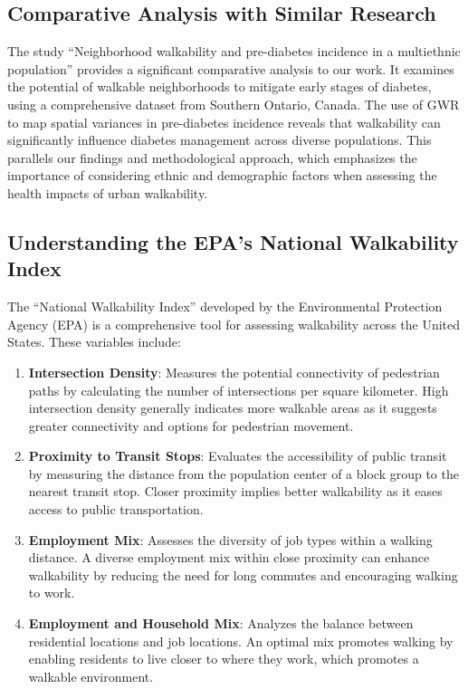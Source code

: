 \documentclass[
]{article}
\begin{document}
\subsection{Comparative Analysis with Similar
Research}\label{comparative-analysis-with-similar-research}

The study ``Neighborhood walkability and pre-diabetes incidence in a
multiethnic population'' provides a significant comparative analysis to
our work. It examines the potential of walkable neighborhoods to
mitigate early stages of diabetes, using a comprehensive dataset from
Southern Ontario, Canada. The use of GWR to map spatial variances in
pre-diabetes incidence reveals that walkability can significantly
influence diabetes management across diverse populations. This parallels
our findings and methodological approach, which emphasizes the
importance of considering ethnic and demographic factors when assessing
the health impacts of urban walkability.

\subsection{Understanding the EPA's National Walkability
Index}\label{understanding-the-epas-national-walkability-index}

The ``National Walkability Index'' developed by the Environmental
Protection Agency (EPA) is a comprehensive tool for assessing
walkability across the United States. These variables include:

\begin{enumerate}
\def\labelenumi{\arabic{enumi}.}
\item
  \textbf{Intersection Density}: Measures the potential connectivity of
  pedestrian paths by calculating the number of intersections per square
  kilometer. High intersection density generally indicates more walkable
  areas as it suggests greater connectivity and options for pedestrian
  movement.
\item
  \textbf{Proximity to Transit Stops}: Evaluates the accessibility of
  public transit by measuring the distance from the population center of
  a block group to the nearest transit stop. Closer proximity implies
  better walkability as it eases access to public transportation.
\item
  \textbf{Employment Mix}: Assesses the diversity of job types within a
  walking distance. A diverse employment mix within close proximity can
  enhance walkability by reducing the need for long commutes and
  encouraging walking to work.
\item
  \textbf{Employment and Household Mix}: Analyzes the balance between
  residential locations and job locations. An optimal mix promotes
  walking by enabling residents to live closer to where they work, which
  promotes a walkable environment.
\end{enumerate}
\end{document}
